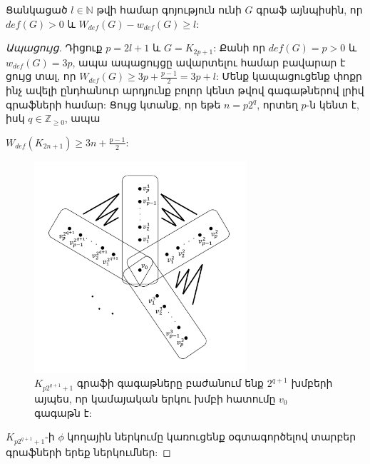 \begin{theorem}
\label{t3_Wdef_wdef_difference} Ցանկացած $l\in \mathbb{N}$ թվի համար գոյություն ունի $G$ գրաֆ այնպիսին, որ $def(G)>0$ և $W_{def}(G)-w_{def}(G)\geq l$:
\end{theorem}
\begin{proof}[Ապացույց]
Դիցուք $p=2l+1$ և $G=K_{2p+1}$: Քանի որ $def(G)=p>0$ և $w_{def}(G)=3p$, ապա ապացույցը ավարտելու համար բավարար է ցույց տալ, որ $W_{def}(G) \geq 3p + \frac{p-1}{2} = 3p + l$: Մենք կապացուցենք փոքր ինչ ավելի ընդհանուր արդյունք բոլոր կենտ թվով գագաթներով լրիվ գրաֆների համար: Ցույց կտանք, որ եթե $n = p2^q$, որտեղ $p$-ն կենտ է, իսկ $q \in \mathbb{Z}_{\geq 0}$, ապա
\begin{center}
$W_{def}(K_{2n+1}) \geq 3n + \frac{p-1}{2}$:
\end{center}

\begin{figure}[t!]
\centering
\includegraphics[width=0.7\textwidth]{figures/complete-graph-edges.pdf}
\caption{$K_{p2^{q+1}+1}$ գրաֆի գագաթները բաժանում ենք $2^{q+1}$ խմբերի այպես, որ կամայական երկու խմբի հատումը $v_0$ գագաթն է:}
\label{complete-graph}
\end{figure}

$K_{p2^{q+1}+1}$-ի $\phi$ կողային ներկումը կառուցենք օգտագործելով %
տարբեր գրաֆների երեք ներկումներ:


\end{proof}
